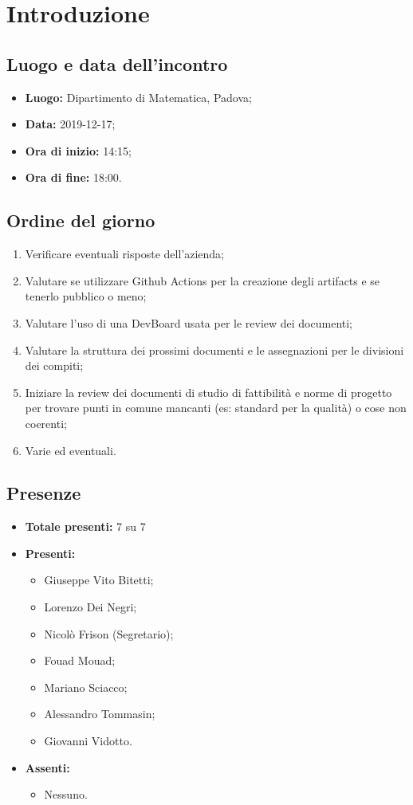 \section*{Introduzione}

\subsection*{Luogo e data dell'incontro}
	\begin{itemize}
		\item \textbf{Luogo:} Dipartimento di Matematica, Padova;
		\item \textbf{Data:} 2019-12-17;
		\item \textbf{Ora di inizio:} 14:15;
		\item \textbf{Ora di fine:} 18:00.
	\end{itemize}

\subsection*{Ordine del giorno}
	\begin{enumerate}
		\item Verificare eventuali risposte dell'azienda;
		\item Valutare se utilizzare Github Actions per la creazione degli artifacts e se tenerlo pubblico o meno;
		\item Valutare l'uso di una DevBoard usata per le review dei documenti;
		\item Valutare la struttura dei prossimi documenti e le assegnazioni per le divisioni dei compiti;
		\item Iniziare la review dei documenti di studio di fattibilità e norme di progetto per trovare punti in comune mancanti (es: standard per la qualità) o cose non coerenti;
		\item Varie ed eventuali.
	\end{enumerate}

\subsection*{Presenze}
	\begin{itemize}
		\item \textbf{Totale presenti:} 7 su 7
		\item \textbf{Presenti: }
			\begin{itemize}			
				\item Giuseppe Vito Bitetti;
				\item Lorenzo Dei Negri;
				\item Nicolò Frison (Segretario);
				\item Fouad Mouad;
				\item Mariano Sciacco;
				\item Alessandro Tommasin;
				\item Giovanni Vidotto.
			\end{itemize}
		\item \textbf{Assenti: } 
			\begin{itemize}	
				\item Nessuno.
			\end{itemize}
	\end{itemize}


